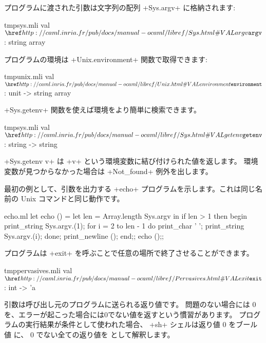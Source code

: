 プログラムに渡された引数は文字列の配列 \ml+Sys.argv+ に格納されます:
%
\begin{listingcodefile}{tmpsys.mli}
val $\indexlibvalue{Sys}{argv}$ : string array
\end{listingcodefile}
%
プログラムの環境は \ml+Unix.environment+ 関数で取得できます:
%
\begin{listingcodefile}{tmpunix.mli}
val $\indexlibvalue{Unix}{environment}$ : unit -> string array
\end{listingcodefile}
%
\ml+Sys.getenv+ 関数を使えば環境をより簡単に検索できます。
%
\begin{listingcodefile}{tmpsys.mli}
val $\indexlibvalue{Sys}{getenv}$ : string -> string
\end{listingcodefile}
%
\ml+Sys.getenv v+ は \ml+v+ という環境変数に結び付けられた値を返します。
環境変数が見つからなかった場合は \ml+Not_found+ 例外を出します。
%
\begin{example}
最初の例として、引数を出力する \ml+echo+ プログラムを示します。これは同じ名前の Unix コマンドと同じ動作です。
\begin{listingcodefile}{echo.ml}
let echo () =
  let len = Array.length Sys.argv in
  if len > 1 then
    begin
      print_string Sys.argv.(1);
      for i = 2 to len - 1 do
        print_char ' ';
        print_string Sys.argv.(i);
      done;
      print_newline ();
    end;;
echo ();;
\end{listingcodefile}
\end{example}

プログラムは \ml+exit+ を呼ぶことで任意の場所で終了させることができます。
%
\begin{listingcodefile}{tmppervasives.mli}
val $\indexlibvalue{Pervasives}{exit}$ : int -> 'a
\end{listingcodefile}
%
引数は呼び出し元のプログラムに送られる返り値です。
問題のない場合には 0 を、エラーが起こった場合には0でない値を返すという慣習があります。
プログラムの実行結果が条件として使われた場合、
\ml+sh+ シェルは返り値 0 をブール値  に、
0 でない全ての返り値を  として解釈します。

